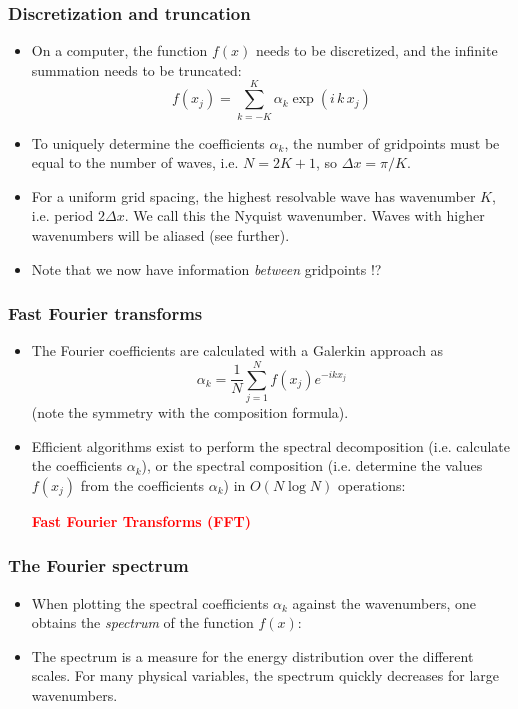 \documentclass[aspectratio=43,9pt]{beamer}
\begin{document}
\begin{frame}
	\frametitle{Discretization and truncation}
	\vfill\begin{itemize}
		\item On a computer, the function $f(x)$ needs to be discretized, and the infinite summation needs to be truncated:
			\begin{equation*}
				f(x_j)=\sum_{k=-K}^K\alpha_k\exp(i \, k \, x_j)
			\end{equation*}\vfill
		\item To uniquely determine the coefficients $\alpha_k$, the number of gridpoints must be equal to the number of waves, i.e. $N=2K+1$, so $\Delta x=\pi/K$.\vfill
		\item For a uniform grid spacing, the highest resolvable wave has wavenumber $K$, i.e. period $2\Delta x$. We call this the Nyquist wavenumber. Waves with higher wavenumbers will be aliased (see further).\vfill
		\item Note that we now have information \emph{between} gridpoints !?
	\end{itemize}\vfill
\end{frame}
%
%
\begin{frame}
	\frametitle{Fast Fourier transforms}
	\vfill\begin{itemize}
		\item The Fourier coefficients are calculated with a Galerkin approach as
			\begin{equation*}
				\alpha_k=\frac{1}{N}\sum_{j=1}^{N} f(x_j) e^{-i k x_j}
			\end{equation*}
			(note the symmetry with the composition formula).\vfill
		\item Efficient algorithms exist to perform the spectral decomposition (i.e. calculate the coefficients $\alpha_k$), or the spectral composition (i.e. determine the values $f(x_j)$ from the coefficients $\alpha_k$) in $O(N\log N)$ operations:\vfill
			\begin{center}
				\textcolor{red}{\Large\bfseries
					Fast Fourier Transforms (FFT)
				}
			\end{center}
	\end{itemize}\vfill
\end{frame}
%
%
\begin{frame}
	\frametitle{The Fourier spectrum}
	\vfill\begin{itemize}
		\item When plotting the spectral coefficients $\alpha_k$ against the wavenumbers, one obtains the \emph{spectrum} of the function $f(x)$:
			\begin{center}
				\scalebox{.7}{\small}
			\end{center}\vfill
		\item The spectrum is a measure for the energy distribution over the different scales. For many physical variables, the spectrum quickly decreases for large wavenumbers.
	\end{itemize}\vfill
\end{frame}
\end{document}
